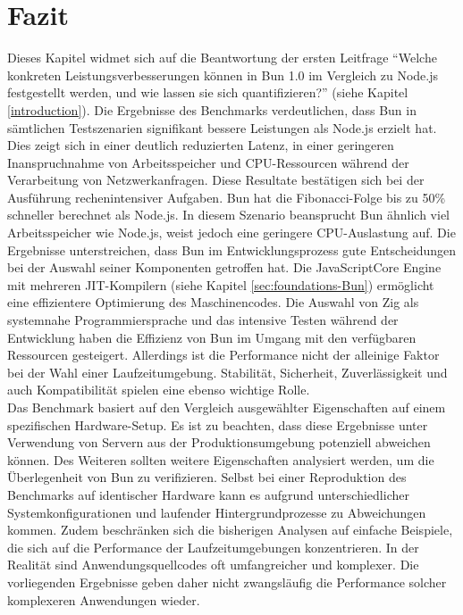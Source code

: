 \section{Fazit} \label{sec:performance-conclusion}
Dieses Kapitel widmet sich auf die Beantwortung der ersten Leitfrage ``Welche konkreten Leistungsverbesserungen können in Bun 1.0 im Vergleich zu Node.js festgestellt werden, und wie lassen sie sich quantifizieren?'' (siehe Kapitel \ref{introduction}). Die Ergebnisse des Benchmarks verdeutlichen, dass Bun in sämtlichen Testszenarien signifikant bessere Leistungen als Node.js erzielt hat. Dies zeigt sich in einer deutlich reduzierten Latenz, in einer geringeren Inanspruchnahme von Arbeitsspeicher und CPU-Ressourcen während der Verarbeitung von Netzwerkanfragen. Diese Resultate bestätigen sich bei der Ausführung rechenintensiver Aufgaben. Bun hat die Fibonacci-Folge bis zu 50\% schneller berechnet als Node.js. In diesem Szenario beansprucht Bun ähnlich viel Arbeitsspeicher wie Node.js, weist jedoch eine geringere CPU-Auslastung auf. \newline
Die Ergebnisse unterstreichen, dass Bun im Entwicklungsprozess gute Entscheidungen bei der Auswahl seiner Komponenten getroffen hat. Die JavaScriptCore Engine mit mehreren JIT-Kompilern (siehe Kapitel \ref{sec:foundations-Bun}) ermöglicht eine effizientere Optimierung des Maschinencodes. Die Auswahl von Zig als systemnahe Programmiersprache und das intensive Testen während der Entwicklung haben die Effizienz von Bun im Umgang mit den verfügbaren Ressourcen gesteigert. Allerdings ist die Performance nicht der alleinige Faktor bei der Wahl einer Laufzeitumgebung. Stabilität, Sicherheit, Zuverlässigkeit und auch Kompatibilität spielen eine ebenso wichtige Rolle.\\

\noindent
Das Benchmark basiert auf den Vergleich ausgewählter Eigenschaften auf einem spezifischen Hardware-Setup. Es ist zu beachten, dass diese Ergebnisse unter Verwendung von Servern aus der Produktionsumgebung potenziell abweichen können. Des Weiteren sollten weitere Eigenschaften analysiert werden, um die Überlegenheit von Bun zu verifizieren. Selbst bei einer Reproduktion des Benchmarks auf identischer Hardware kann es aufgrund unterschiedlicher Systemkonfigurationen und laufender Hintergrundprozesse zu Abweichungen kommen. Zudem beschränken sich die bisherigen Analysen auf einfache Beispiele, die sich auf die Performance der Laufzeitumgebungen konzentrieren. In der Realität sind Anwendungsquellcodes oft umfangreicher und komplexer. Die vorliegenden Ergebnisse geben daher nicht zwangsläufig die Performance solcher komplexeren Anwendungen wieder.\\

